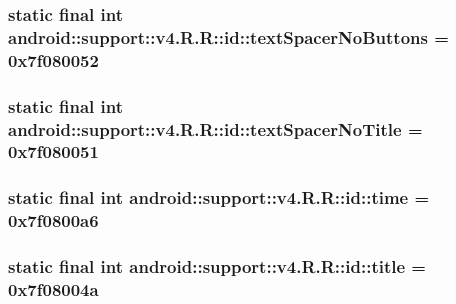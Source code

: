 \hypertarget{classandroid_1_1support_1_1v4_1_1_r_1_1id_c64e985ede3dd59e6250378be5b5910a}{
\subsubsection[{textSpacerNoButtons}]{\setlength{\rightskip}{0pt plus 5cm}static final int android::support::v4.R.R::id::textSpacerNoButtons = 0x7f080052}}
\label{classandroid_1_1support_1_1v4_1_1_r_1_1id_c64e985ede3dd59e6250378be5b5910a}


\hypertarget{classandroid_1_1support_1_1v4_1_1_r_1_1id_17025ed833be904c13bc412a6d2750fa}{
\subsubsection[{textSpacerNoTitle}]{\setlength{\rightskip}{0pt plus 5cm}static final int android::support::v4.R.R::id::textSpacerNoTitle = 0x7f080051}}
\label{classandroid_1_1support_1_1v4_1_1_r_1_1id_17025ed833be904c13bc412a6d2750fa}


\hypertarget{classandroid_1_1support_1_1v4_1_1_r_1_1id_b971b53aef763e76ede9c88afad9ab54}{
\subsubsection[{time}]{\setlength{\rightskip}{0pt plus 5cm}static final int android::support::v4.R.R::id::time = 0x7f0800a6}}
\label{classandroid_1_1support_1_1v4_1_1_r_1_1id_b971b53aef763e76ede9c88afad9ab54}


\hypertarget{classandroid_1_1support_1_1v4_1_1_r_1_1id_cf78f7d7de9176578ffbddf81ca41608}{
\subsubsection[{title}]{\setlength{\rightskip}{0pt plus 5cm}static final int android::support::v4.R.R::id::title = 0x7f08004a}}
\label{classandroid_1_1support_1_1v4_1_1_r_1_1id_cf78f7d7de9176578ffbddf81ca41608}


